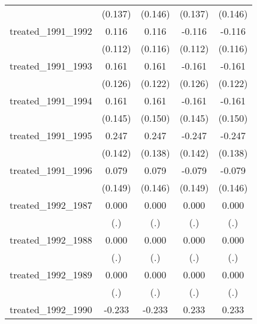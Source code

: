 {\begin{tabular}{l*{4}{c}}
            &     (0.137)         &     (0.146)         &     (0.137)         &     (0.146)         \\
[1em]
treated\_1991\_1992&       0.116         &       0.116         &      -0.116         &      -0.116         \\
            &     (0.112)         &     (0.116)         &     (0.112)         &     (0.116)         \\
[1em]
treated\_1991\_1993&       0.161         &       0.161         &      -0.161         &      -0.161         \\
            &     (0.126)         &     (0.122)         &     (0.126)         &     (0.122)         \\
[1em]
treated\_1991\_1994&       0.161         &       0.161         &      -0.161         &      -0.161         \\
            &     (0.145)         &     (0.150)         &     (0.145)         &     (0.150)         \\
[1em]
treated\_1991\_1995&       0.247         &       0.247         &      -0.247         &      -0.247         \\
            &     (0.142)         &     (0.138)         &     (0.142)         &     (0.138)         \\
[1em]
treated\_1991\_1996&       0.079         &       0.079         &      -0.079         &      -0.079         \\
            &     (0.149)         &     (0.146)         &     (0.149)         &     (0.146)         \\
[1em]
treated\_1992\_1987&       0.000         &       0.000         &       0.000         &       0.000         \\
            &         (.)         &         (.)         &         (.)         &         (.)         \\
[1em]
treated\_1992\_1988&       0.000         &       0.000         &       0.000         &       0.000         \\
            &         (.)         &         (.)         &         (.)         &         (.)         \\
[1em]
treated\_1992\_1989&       0.000         &       0.000         &       0.000         &       0.000         \\
            &         (.)         &         (.)         &         (.)         &         (.)         \\
[1em]
treated\_1992\_1990&      -0.233         &      -0.233         &       0.233         &       0.233         \\

\end{tabular}}
